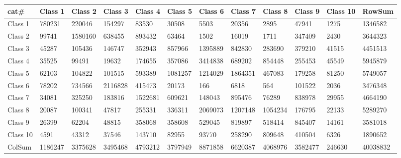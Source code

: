 ﻿\begin{table}[!ht]
    \centering
    \begin{tabular}{|l|l|l|l|l|l|l|l|l|l|l|l|}
    \hline
        cat\# & Class 1 & Class 2 & Class 3 & Class 4 & Class 5 & Class 6 & Class 7 & Class 8 & Class 9 & Class 10 & RowSum \\ \hline
        Class 1 & 780231 & 220046 & 154297 & 83530 & 30508 & 5503 & 20356 & 2895 & 47941 & 1275 & 1346582 \\ \hline
        Class 2 & 99741 & 1580160 & 638455 & 893432 & 63464 & 1502 & 16019 & 1711 & 347409 & 2430 & 3644323 \\ \hline
        Class 3 & 45287 & 105436 & 146747 & 352943 & 857966 & 1395889 & 842830 & 283690 & 379210 & 41515 & 4451513 \\ \hline
        Class 4 & 35525 & 99491 & 19632 & 174655 & 357086 & 3414838 & 689202 & 854448 & 255453 & 45549 & 5945879 \\ \hline
        Class 5 & 62103 & 104822 & 101515 & 593389 & 1081257 & 1214029 & 1864351 & 467083 & 179258 & 81250 & 5749057 \\ \hline
        Class 6 & 78202 & 734566 & 2116828 & 415473 & 20173 & 166 & 6818 & 564 & 101522 & 2036 & 3476348 \\ \hline
        Class 7 & 34081 & 325250 & 183816 & 1522681 & 609621 & 148043 & 895476 & 76289 & 838978 & 29955 & 4664190 \\ \hline
        Class 8 & 20087 & 100341 & 47817 & 255331 & 336311 & 2069073 & 1207148 & 1054234 & 176795 & 22133 & 5289270 \\ \hline
        Class 9 & 26399 & 62204 & 48815 & 358068 & 358608 & 529045 & 819897 & 518414 & 845407 & 14161 & 3581018 \\ \hline
        Class 10 & 4591 & 43312 & 37546 & 143710 & 82955 & 93770 & 258290 & 809648 & 410504 & 6326 & 1890652 \\ \hline
        ColSum & 1186247 & 3375628 & 3495468 & 4793212 & 3797949 & 8871858 & 6620387 & 4068976 & 3582477 & 246630 & 40038832 \\ \hline
    \end{tabular}
\end{table}